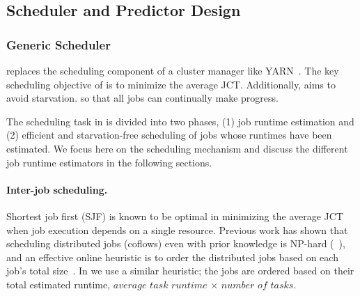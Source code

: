 \subsection{Scheduler and Predictor Design}
\label{sec:study:design}


\subsubsection{Generic Scheduler \gs}
\label{sec:design:gs}

\gs replaces the scheduling component of a cluster manager like YARN~\cite{yarn:web}. 
The key scheduling objective of \gs is to minimize the average JCT.
Additionally, \gs aims to avoid starvation.
\rm{so that all jobs can continually make progress.}

The scheduling task in \gs is divided into two phases, (1) job runtime estimation
and (2) efficient and starvation-free scheduling of jobs whose runtimes have been
estimated. 
We focus here on the scheduling mechanism 
and discuss the different job runtime estimators in the following sections.


\paragraph{Inter-job scheduling. }
Shortest job first (SJF) is known to be optimal in minimizing the average JCT
when job execution depends on a single resource.
Previous work has shown
that scheduling distributed jobs (\eg coflows) even with prior knowledge is NP-hard (\eg~\cite{varys:sigcomm14}),
and an effective online heuristic is to order the distributed jobs
based on each job's total size~\cite{aalo:sigcomm15}.
{In \gs we use} a similar heuristic;
the jobs are ordered based on their total estimated runtime, \ie $average$ $task$ $runtime$
$\times$ $number$ $of$ $tasks$.

